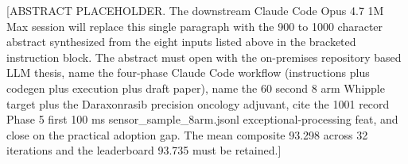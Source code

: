 [ABSTRACT PLACEHOLDER. The downstream Claude Code Opus 4.7 1M Max
session will replace this single paragraph with the 900 to 1000
character abstract synthesized from the eight inputs listed above in
the bracketed instruction block. The abstract must open with the
on-premises repository based LLM thesis, name the four-phase Claude
Code workflow (instructions plus codegen plus execution plus draft
paper), name the 60 second 8 arm Whipple target plus the
Daraxonrasib precision oncology adjuvant, cite the 1001 record Phase
5 first 100 ms sensor_sample_8arm.jsonl exceptional-processing feat,
and close on the practical adoption gap. The mean composite 93.298
across 32 iterations and the leaderboard 93.735 must be retained.]
